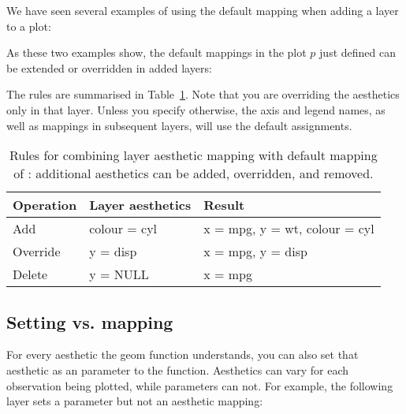 % 
%


We have seen several examples of using the default mapping when adding a layer to a plot:

% 


As these two examples show, the default mappings in the plot $p$ just defined  can be extended or overridden in added layers:

% 


\noindent The rules are summarised in Table~\ref{tbl:aes-override}.  Note that you are overriding the aesthetics only in that layer.  Unless you specify otherwise, the axis and legend names, as well as mappings in subsequent layers, will use the default assignments. 

\begin{table}
  \begin{center}
  \begin{tabular}{lll}
    \toprule
    Operation & Layer aesthetics  & Result \\
    \midrule
    Add       & colour = cyl & x = mpg, y = wt, colour = cyl \\
    Override  & y = disp     & x = mpg, y = disp \\
    Delete    & y = NULL     & x = mpg \\
    \bottomrule
  \end{tabular}
  \end{center}
  \caption{Rules for combining layer aesthetic mapping with default mapping of :  additional aesthetics can be added, overridden, and removed.}
  \label{tbl:aes-override}
\end{table}


\subsection{Setting vs. mapping}
\label{sub:setting-mapping}

For every aesthetic the geom function understands, you can also set that aesthetic as an parameter to the function.  Aesthetics can vary for each observation being plotted, while parameters can not.  For example, the following layer sets a parameter but not an aesthetic mapping:

